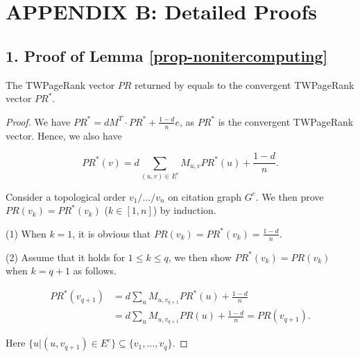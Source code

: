 \newpage
%

\section*{APPENDIX B: Detailed Proofs}
\label{sec-proof}

\subsection*{1. Proof of Lemma \ref{prop-nonitercomputing}}

The TWPageRank vector $PR$ returned by \twprdag equals to the convergent TWPageRank vector $PR^*$.

\begin{proof}
We have $PR^* = d M^T\cdot PR^* + \frac{1-d}{n} e$, as $PR^*$ is the convergent TWPageRank vector. Hence, we also have
\begin{small}
\begin{equation}
PR^*(v)=d \sum_{(u,v)\in E^c} M_{u,v} PR^*(u) + \frac{1-d}{n}.
\end{equation}
\end{small}

\vspace{-1ex}

Consider a topological order $v_1/\dots/v_n$ on citation graph $G^c$. We then prove $PR(v_k)=PR^*(v_k)$ ($k\in[1,n]$) by induction.

\noindent(1) When $k=1$, it is obvious that $PR(v_k)=PR^*(v_k)=\frac{1-d}{n}$. %

\noindent(2) Assume that it holds for $1\leq k \leq q$, we then show $PR^*(v_k)=PR(v_k)$ when $k=q+1$ as follows.
\begin{small}
\begin{equation*}
\begin{split}
PR^*(v_{q+1}) & = d \sum_u M_{u,v_{q+1}} PR^*(u) + \frac{1-d}{n} \\
 & = d \sum_u M_{u,v_{q+1}} PR(u) + \frac{1-d}{n}  = PR(v_{q+1}).
\end{split}
\end{equation*}
\end{small}

\vspace{-1ex}
\noindent Here $\{u|(u,v_{q+1})\in E^c\}\subseteq \{v_1,\dots,v_q\}$.
\end{proof}







